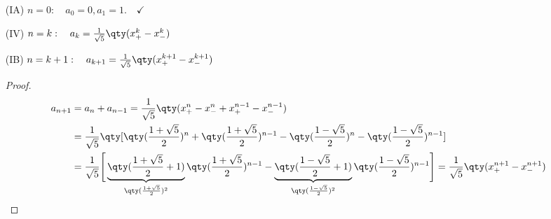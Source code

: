 \begin{enumerate}
    \setlength{\mathindent}{0cm}
    \item[(IA)] $n=0: \quad a_0 = 0, a_1 = 1. \quad\checkmark$ 
    \item[(IV)] $n=k: \quad a_k = \frac{1}{\sqrt{5}}\qty(x_+^k-x_-^k)$
    \item[(IB)] $n=k+1: \quad a_{k+1} = \frac{1}{\sqrt{5}}\qty(x_+^{k+1}-x_-^{k+1})$
    \begin{proof}
        \begin{align}
            a_{n+1}&=a_n+a_{n-1}=\frac{1}{\sqrt{5}}\qty(x_+^n-x_-^n+x_+^{n-1}-x_-^{n-1})\\
            &=\frac{1}{\sqrt{5}}\qty[\qty(\frac{1+\sqrt{5}}{2})^n+\qty(\frac{1+\sqrt{5}}{2})^{n-1}-\qty(\frac{1-\sqrt{5}}{2})^n-\qty(\frac{1-\sqrt{5}}{2})^{n-1}]\\
            &=\frac{1}{\sqrt{5}}\Bigg[\underbrace{\qty(\frac{1+\sqrt{5}}{2}+1)}_{\qty(\frac{1+\sqrt{5}}{2})^2}\qty(\frac{1+\sqrt{5}}{2})^{n-1}-\underbrace{\qty(\frac{1-\sqrt{5}}{2}+1)}_{\qty(\frac{1-\sqrt{5}}{2})^2}\qty(\frac{1-\sqrt{5}}{2})^{n-1}\Bigg]
            =\frac{1}{\sqrt{5}}\qty(x_+^{n+1}-x_-^{n+1})
        \end{align}
    \end{proof}
\end{enumerate}